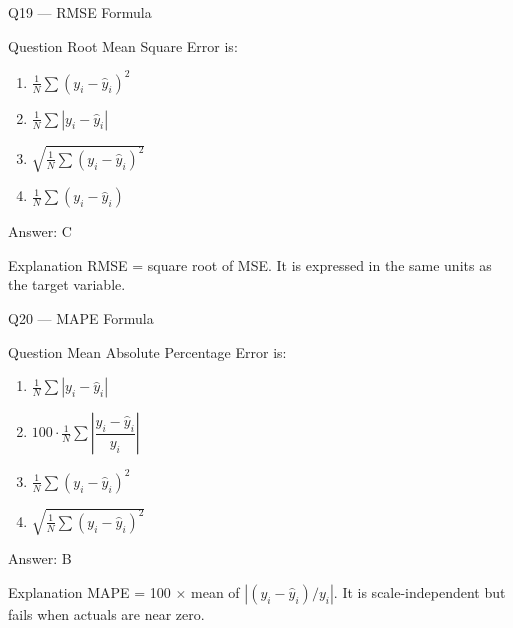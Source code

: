 \documentclass[aspectratio=169,8pt]{beamer}
\begin{document}
	\begin{frame}{Q19 --- RMSE Formula}
		\begin{block}{Question}
			Root Mean Square Error is:
			\begin{enumerate}
				\item $\frac{1}{N}\sum (y_i - \hat{y}_i)^2$
				\item $\frac{1}{N}\sum |y_i - \hat{y}_i|$
				\item $\sqrt{\frac{1}{N}\sum (y_i - \hat{y}_i)^2}$
				\item $\frac{1}{N}\sum (y_i - \hat{y}_i)$
			\end{enumerate}
		\end{block}
		\begin{exampleblock}{Answer: C}\end{exampleblock}
		\begin{block}{Explanation}
			RMSE = square root of MSE. It is expressed in the same units as the target variable.
		\end{block}
	\end{frame}
	
	\begin{frame}{Q20 --- MAPE Formula}
		\begin{block}{Question}
			Mean Absolute Percentage Error is:
			\begin{enumerate}
				\item $\frac{1}{N}\sum |y_i - \hat{y}_i|$
				\item $100 \cdot \frac{1}{N}\sum \left|\dfrac{y_i - \hat{y}_i}{y_i}\right|$
				\item $\frac{1}{N}\sum (y_i - \hat{y}_i)^2$
				\item $\sqrt{\frac{1}{N}\sum (y_i - \hat{y}_i)^2}$
			\end{enumerate}
		\end{block}
		\begin{exampleblock}{Answer: B}\end{exampleblock}
		\begin{block}{Explanation}
			MAPE = 100 $\times$ mean of $|(y_i - \hat{y}_i)/y_i|$. It is scale-independent but fails when actuals are near zero.
		\end{block}
	\end{frame}
	
\end{document}
